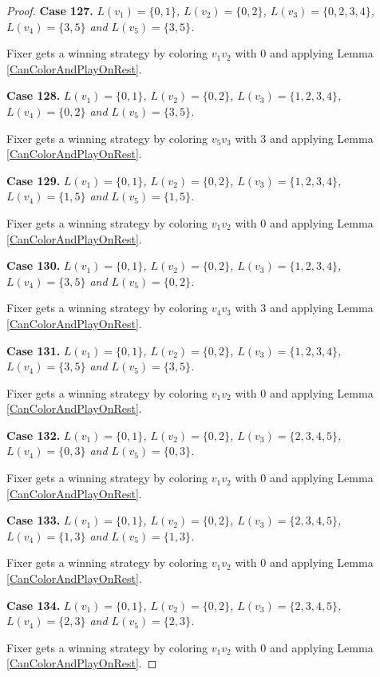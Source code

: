\documentclass[12pt]{amsart}
\theoremstyle{plain}
\theoremstyle{definition}
\theoremstyle{remark}
\begin{document}
\begin{proof}
\noindent\textbf{Case 127.  }\textit{$L(v_1) = \{0, 1\}$, $L(v_2) = \{0, 2\}$, $L(v_3) = \{0, 2, 3, 4\}$, $L(v_4) = \{3, 5\}$ and $L(v_5) = \{3, 5\}$.}

Fixer gets a winning strategy by coloring $v_1v_2$ with $0$ and applying Lemma \ref{CanColorAndPlayOnRest}.

\noindent\textbf{Case 128.  }\textit{$L(v_1) = \{0, 1\}$, $L(v_2) = \{0, 2\}$, $L(v_3) = \{1, 2, 3, 4\}$, $L(v_4) = \{0, 2\}$ and $L(v_5) = \{3, 5\}$.}

Fixer gets a winning strategy by coloring $v_5v_3$ with $3$ and applying Lemma \ref{CanColorAndPlayOnRest}.

\noindent\textbf{Case 129.  }\textit{$L(v_1) = \{0, 1\}$, $L(v_2) = \{0, 2\}$, $L(v_3) = \{1, 2, 3, 4\}$, $L(v_4) = \{1, 5\}$ and $L(v_5) = \{1, 5\}$.}

Fixer gets a winning strategy by coloring $v_1v_2$ with $0$ and applying Lemma \ref{CanColorAndPlayOnRest}.

\noindent\textbf{Case 130.  }\textit{$L(v_1) = \{0, 1\}$, $L(v_2) = \{0, 2\}$, $L(v_3) = \{1, 2, 3, 4\}$, $L(v_4) = \{3, 5\}$ and $L(v_5) = \{0, 2\}$.}

Fixer gets a winning strategy by coloring $v_4v_3$ with $3$ and applying Lemma \ref{CanColorAndPlayOnRest}.

\noindent\textbf{Case 131.  }\textit{$L(v_1) = \{0, 1\}$, $L(v_2) = \{0, 2\}$, $L(v_3) = \{1, 2, 3, 4\}$, $L(v_4) = \{3, 5\}$ and $L(v_5) = \{3, 5\}$.}

Fixer gets a winning strategy by coloring $v_1v_2$ with $0$ and applying Lemma \ref{CanColorAndPlayOnRest}.

\noindent\textbf{Case 132.  }\textit{$L(v_1) = \{0, 1\}$, $L(v_2) = \{0, 2\}$, $L(v_3) = \{2, 3, 4, 5\}$, $L(v_4) = \{0, 3\}$ and $L(v_5) = \{0, 3\}$.}

Fixer gets a winning strategy by coloring $v_1v_2$ with $0$ and applying Lemma \ref{CanColorAndPlayOnRest}.

\noindent\textbf{Case 133.  }\textit{$L(v_1) = \{0, 1\}$, $L(v_2) = \{0, 2\}$, $L(v_3) = \{2, 3, 4, 5\}$, $L(v_4) = \{1, 3\}$ and $L(v_5) = \{1, 3\}$.}

Fixer gets a winning strategy by coloring $v_1v_2$ with $0$ and applying Lemma \ref{CanColorAndPlayOnRest}.

\noindent\textbf{Case 134.  }\textit{$L(v_1) = \{0, 1\}$, $L(v_2) = \{0, 2\}$, $L(v_3) = \{2, 3, 4, 5\}$, $L(v_4) = \{2, 3\}$ and $L(v_5) = \{2, 3\}$.}

Fixer gets a winning strategy by coloring $v_1v_2$ with $0$ and applying Lemma \ref{CanColorAndPlayOnRest}.


\end{proof}
\end{document}
